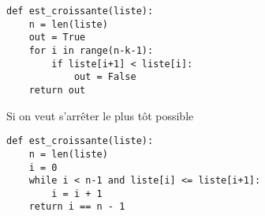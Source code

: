 \begin{Answer}
\begin{lstlisting}
def est_croissante(liste):
    n = len(liste)
    out = True
    for i in range(n-k-1):
        if liste[i+1] < liste[i]:
            out = False
    return out
\end{lstlisting}

Si on veut s'arrêter le plus tôt possible
\begin{lstlisting}
def est_croissante(liste):
    n = len(liste)
    i = 0
    while i < n-1 and liste[i] <= liste[i+1]:
        i = i + 1
    return i == n - 1
\end{lstlisting}
\end{Answer}
